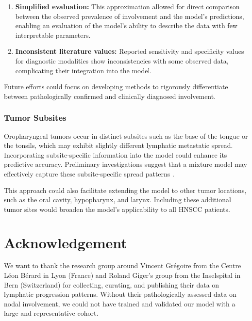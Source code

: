 \documentclass[
  sn-mathphys-num,
]{sn-jnl}
\providecommand{\tightlist}{%
  \setlength{\itemsep}{0pt}\setlength{\parskip}{0pt}}\usepackage{longtable,booktabs,array}
\begin{document}
\begin{enumerate}
\def\labelenumi{\arabic{enumi}.}
\tightlist
\item
  \textbf{Simplified evaluation:} This approximation allowed for direct
  comparison between the observed prevalence of involvement and the
  model's predictions, enabling an evaluation of the model's ability to
  describe the data with few interpretable parameters.
\item
  \textbf{Inconsistent literature values:} Reported sensitivity and
  specificity values for diagnostic modalities show inconsistencies with
  some observed data, complicating their integration into the model.
\end{enumerate}

Future efforts could focus on developing methods to rigorously
differentiate between pathologically confirmed and clinically diagnosed
involvement.

\subsubsection{Tumor Subsites}\label{tumor-subsites}

Oropharyngeal tumors occur in distinct subsites such as the base of the
tongue or the tonsils, which may exhibit slightly different lymphatic
metastatic spread. Incorporating subsite-specific information into the
model could enhance its predictive accuracy. Preliminary investigations
suggest that a mixture model may effectively capture these
subsite-specific spread patterns
\citep{sarrut_proceedings_2024, ludwig_modelling_2023a}.

This approach could also facilitate extending the model to other tumor
locations, such as the oral cavity, hypopharynx, and larynx. Including
these additional tumor sites would broaden the model's applicability to
all HNSCC patients.

\section{Acknowledgement}\label{acknowledgement}

We want to thank the research group around Vincent Grégoire from the
Centre Léon Bérard in Lyon (France) and Roland Giger's group from the
Inselspital in Bern (Switzerland) for collecting, curating, and
publishing their data on lymphatic progression patterns. Without their
pathologically assessed data on nodal involvement, we could not have
trained and validated our model with a large and representative cohort.
\end{document}
